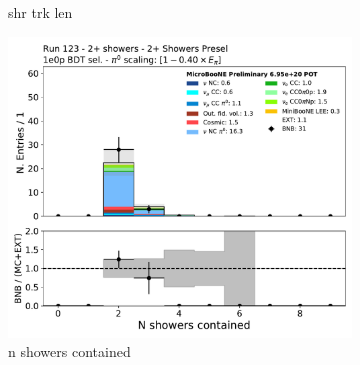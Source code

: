 \begin{figure}[H]
\begin{subfigure}{0.3\textwidth}
    \caption{shr trk len}
    \end{subfigure}
    \begin{subfigure}{0.3\textwidth}
    \includegraphics[width=1.0\textwidth]{Sidebands/Figures/TwoShr_1e0pSel/BDT/n_showers_contained.pdf}
    \caption{n showers contained}
    \end{subfigure}
    \caption{} 
    \label{fig:HE_1eNp_1}
\end{figure}

